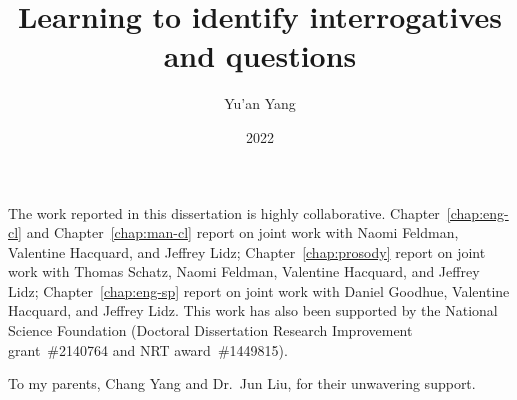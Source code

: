\documentclass[12pt]{umd-thesis}
\title{Learning to identify interrogatives and questions}
\author{Yu'an Yang}
\date{2022}
\begin{document}
\frontmatter

\begin{abstract}
  
\end{abstract}

\maketitlepage

\makecopyrightpage

\begin{preface}
The work reported in this dissertation is highly collaborative. Chapter~\ref{chap:eng-cl} and Chapter~\ref{chap:man-cl}
report on joint work with Naomi Feldman, Valentine Hacquard, and Jeffrey Lidz; Chapter~\ref{chap:prosody} report on joint work with Thomas Schatz, Naomi Feldman, Valentine Hacquard, and Jeffrey Lidz; Chapter~\ref{chap:eng-sp} report on joint work with Daniel Goodhue, Valentine Hacquard, and Jeffrey Lidz. This work has also been supported by the National Science Foundation (Doctoral Dissertation Research Improvement grant~\#2140764 and NRT award~\#1449815).
\end{preface}

\begin{dedication}
\centering
To my parents, Chang Yang and Dr.~Jun Liu, for their unwavering support.
\end{dedication}

\begin{acknowledgments}
  
\end{acknowledgments}

\tableofcontents\clearpage
\listoftables\clearpage
\listoffigures\clearpage
\begin{abbreviations}
  \renewcommand{\glossarysection}[2][]{}
  \printglossary[nonumberlist]
\end{abbreviations}



\mainmatter













\backmatter

\printbibliography
\end{document}

